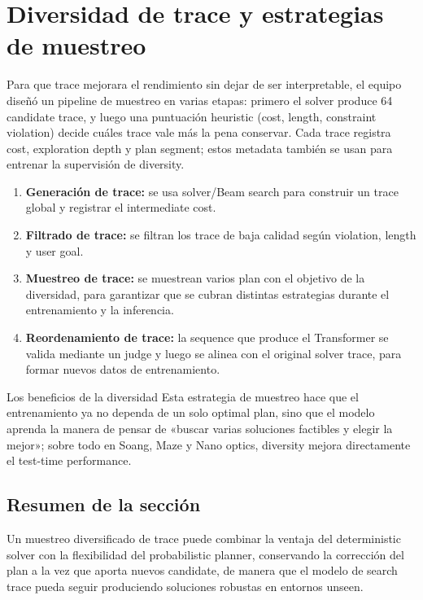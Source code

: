\section{Diversidad de trace y estrategias de muestreo}

Para que trace mejorara el rendimiento sin dejar de ser interpretable, el equipo diseñó un pipeline de muestreo en varias etapas: primero el solver produce 64 candidate trace, y luego una puntuación heuristic (cost, length, constraint violation) decide cuáles trace vale más la pena conservar. Cada trace registra cost, exploration depth y plan segment; estos metadata también se usan para entrenar la supervisión de diversity.
\begin{enumerate}
    \item \textbf{Generación de trace:} se usa solver/Beam search para construir un trace global y registrar el intermediate cost.
    \item \textbf{Filtrado de trace:} se filtran los trace de baja calidad según violation, length y user goal.
    \item \textbf{Muestreo de trace:} se muestrean varios plan con el objetivo de la diversidad, para garantizar que se cubran distintas estrategias durante el entrenamiento y la inferencia.
    \item \textbf{Reordenamiento de trace:} la sequence que produce el Transformer se valida mediante un judge y luego se alinea con el original solver trace, para formar nuevos datos de entrenamiento.
\end{enumerate}
\begin{knowledgebox}{Los beneficios de la diversidad}
Esta estrategia de muestreo hace que el entrenamiento ya no dependa de un solo optimal plan, sino que el modelo aprenda la manera de pensar de «buscar varias soluciones factibles y elegir la mejor»; sobre todo en Soang, Maze y Nano optics, diversity mejora directamente el test-time performance.
\end{knowledgebox}

\subsection{Resumen de la sección}

Un muestreo diversificado de trace puede combinar la ventaja del deterministic solver con la flexibilidad del probabilistic planner, conservando la corrección del plan a la vez que aporta nuevos candidate, de manera que el modelo de search trace pueda seguir produciendo soluciones robustas en entornos unseen.

